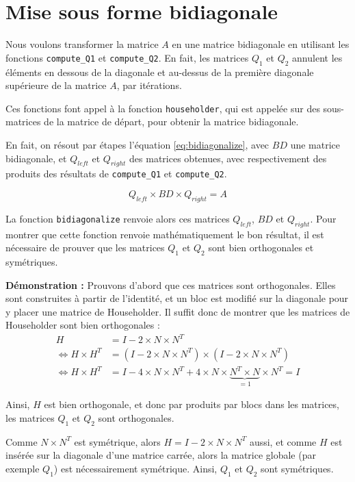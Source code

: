\section{Mise sous forme bidiagonale}
Nous voulons transformer la matrice $A$ en une matrice bidiagonale en utilisant les fonctions \verb|compute_Q1| et \verb|compute_Q2|.
En fait, les matrices $Q_1$ et $Q_2$ annulent les éléments en dessous de la diagonale et au-dessus de la première diagonale supérieure de la matrice $A$, par itérations.

Ces fonctions font appel à la fonction \verb|householder|, qui est appelée sur des sous-matrices de la matrice de départ, pour obtenir la matrice bidiagonale.

En fait, on résout par étapes l'équation \ref{eq:bidiagonalize}, avec $BD$ une matrice bidiagonale, et $Q_{left}$ et $Q_{right}$ des matrices obtenues,
avec respectivement des produits des résultats de \verb|compute_Q1| et \verb|compute_Q2|.

\begin{equation}
	Q_{left} \times BD \times Q_{right} = A
	\label{eq:bidiagonalize}
\end{equation}

La fonction \verb|bidiagonalize| renvoie alors ces matrices $Q_{left}$, $BD$ et $Q_{right}$.
Pour montrer que cette fonction renvoie mathématiquement le bon résultat, il est nécessaire de prouver que les matrices $Q_1$ et $Q_2$ sont bien orthogonales et symétriques.

\bigbreak
\noindent\textbf{Démonstration :}
Prouvons d'abord que ces matrices sont orthogonales.
	Elles sont construites à partir de l'identité, et un bloc est modifié sur la diagonale pour y placer une matrice de Householder.
	Il suffit donc de montrer que les matrices de Householder sont bien orthogonales :
	\begin{align*}
		H &= I - 2 \times N \times N^T\\
		\Leftrightarrow H \times H^T &= (I - 2 \times N \times N^T) \times (I - 2 \times N \times N^T)\\
		\Leftrightarrow H \times H^T &= I - 4 \times N \times N^T + 4 \times N \times \underbrace{N^T \times N}_{= 1} \times N^T = I
	\end{align*}
	
	Ainsi, $H$ est bien orthogonale, et donc par produits par blocs dans les matrices, les matrices $Q_1$ et $Q_2$ sont orthogonales.
	
	Comme $N \times N^T$ est symétrique, alors $H = I - 2 \times N \times N^T$ aussi, et comme $H$ est insérée sur la diagonale d'une matrice carrée, 
	alors la matrice globale (par exemple $Q_1$) est nécessairement symétrique.
	Ainsi, $Q_1$ et $Q_2$ sont symétriques.
\qedsymbol
\bigbreak

